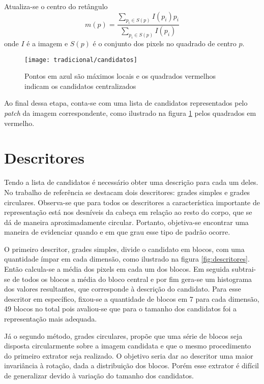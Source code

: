 Atualiza-se o centro do retângulo
\begin{equation}
	\label{eq:mean-shift}
	m(p) = \frac{\sum_{p_i \in S(p)} I(p_i)p_i}{\sum_{p_i \in S(p)} I(p_i)}
\end{equation}
onde $I$ é a imagem e $S(p)$ é o conjunto dos pixels no quadrado de centro $p$.

\begin{figure}[h]
\centering
\texttt{[image: tradicional/candidatos]}
\caption{Pontos em azul são máximos locais e os quadrados vermelhos indicam os candidatos centralizados}
\label{fig:candidatos}
\end{figure}

Ao final dessa etapa, conta-se com uma lista de candidatos representados pelo \textit{patch} da imagem correspondente, como ilustrado na figura \ref{fig:candidatos} pelos quadrados em vermelho.

\section{Descritores}
\label{sec:tradicional-descritores}
Tendo a lista de candidatos é necessário obter uma descrição para cada um deles. No trabalho de referência se destacam dois descritores: grades simples e grades circulares. Observa-se que para todos os descritores a característica importante de representação está nos desníveis da cabeça em relação ao resto do corpo, que se dá de maneira aproximadamente circular. Portanto, objetiva-se encontrar uma maneira de evidenciar quando e em que grau esse tipo de padrão ocorre.

O primeiro descritor, grades simples, divide o candidato em blocos, com uma quantidade ímpar em cada dimensão, como ilustrado na figura \ref{fig:descritores}. Então calcula-se a média dos pixels em cada um dos blocos. Em seguida subtrai-se de todos os blocos a média do bloco central e por fim gera-se um histograma dos valores resultantes, que corresponde à descrição do candidato. Para esse descritor em específico, fixou-se a quantidade de blocos em 7 para cada dimensão, 49 blocos no total pois avaliou-se que para o tamanho dos candidatos foi a representação mais adequada.

Já o segundo método, grades circulares, propõe que uma série de blocos seja disposta circularmente sobre a imagem candidata e que o mesmo procedimento do primeiro extrator seja realizado. O objetivo seria dar ao descritor uma maior invariância à rotação, dada a distribuição dos blocos. Porém esse extrator é difícil de generalizar devido à variação do tamanho dos candidatos.

